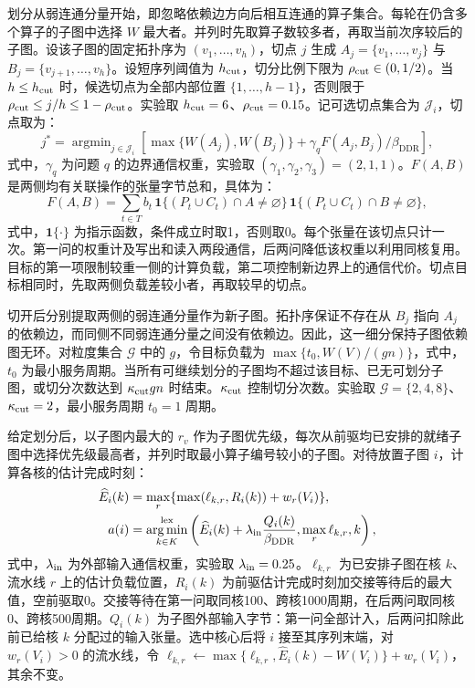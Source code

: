 划分从弱连通分量开始，即忽略依赖边方向后相互连通的算子集合。每轮在仍含多个算子的子图中选择 $W$ 最大者。并列时先取算子数较多者，再取当前次序较后的子图。设该子图的固定拓扑序为 $(v_1,\ldots,v_h)$，切点 $j$ 生成 $A_j=\{v_1,\ldots,v_j\}$ 与 $B_j=\{v_{j+1},\ldots,v_h\}$。设短序列阈值为 $h_{\rm cut}$，切分比例下限为 $\rho_{\rm cut}\in(0,1/2)$。当 $h\le h_{\rm cut}$ 时，候选切点为全部内部位置 $\{1,\ldots,h-1\}$，否则限于 $\rho_{\rm cut}\le j/h\le1-\rho_{\rm cut}$。实验取 $h_{\rm cut}=6$、$\rho_{\rm cut}=0.15$。记可选切点集合为 $\mathcal J_i$，切点取为：
\begin{equation}
 j^*=\mathop{\arg\min}_{j\in\mathcal J_i}
 \left[\max\{W(A_j),W(B_j)\}+\gamma_q F(A_j,B_j)/\beta_{\mathrm{DDR}}\right],
 \label{eq:frontier_construct}
\end{equation}
\noindent 式中，$\gamma_q$ 为问题 $q$ 的边界通信权重，实验取 $(\gamma_1,\gamma_2,\gamma_3)=(2,1,1)$。$F(A,B)$ 是两侧均有关联操作的张量字节总和，具体为：
\begin{equation}
 F(A,B)=\sum_{t\in T}b_t\,
 \mathbf1\{(P_t\cup C_t)\cap A\ne\varnothing\}\,
 \mathbf1\{(P_t\cup C_t)\cap B\ne\varnothing\},
\label{eq:cut_communication}
\end{equation}
\noindent 式中，$\mathbf1\{\cdot\}$ 为指示函数，条件成立时取1，否则取0。每个张量在该切点只计一次。第一问的权重计及写出和读入两段通信，后两问降低该权重以利用同核复用。目标的第一项限制较重一侧的计算负载，第二项控制新边界上的通信代价。切点目标相同时，先取两侧负载差较小者，再取较早的切点。

切开后分别提取两侧的弱连通分量作为新子图。拓扑序保证不存在从 $B_j$ 指向 $A_j$ 的依赖边，而同侧不同弱连通分量之间没有依赖边。因此，这一细分保持子图依赖图无环。对粒度集合 $\mathcal G$ 中的 $g$，令目标负载为 $\max\{t_0,W(V)/(gn)\}$，式中，$t_0$ 为最小服务周期。当所有可继续划分的子图均不超过该目标、已无可划分子图，或切分次数达到 $\kappa_{\rm cut}gn$ 时结束。$\kappa_{\rm cut}$ 控制切分次数。实验取 $\mathcal G=\{2,4,8\}$、$\kappa_{\rm cut}=2$，最小服务周期 $t_0=1$ 周期。

给定划分后，以子图内最大的 $r_v$ 作为子图优先级，每次从前驱均已安排的就绪子图中选择优先级最高者，并列时取最小算子编号较小的子图。对待放置子图 $i$，计算各核的估计完成时刻：
\begin{equation}
 \begin{aligned}
 \widehat E_i(k)&=\max_r\{\max(\ell_{k,r},R_i(k))+w_r(V_i)\},\\
 a(i)&=\mathop{\arg\min}_{k\in K}^{\mathrm{lex}}
 \left(\widehat E_i(k)+\lambda_{\rm in}\frac{Q_i(k)}{\beta_{\mathrm{DDR}}},\max_r\ell_{k,r},k\right),
 \end{aligned}
 \label{eq:construct_map}
\end{equation}
\noindent 式中，$\lambda_{\rm in}$ 为外部输入通信权重，实验取 $\lambda_{\rm in}=0.25$。$\ell_{k,r}$ 为已安排子图在核 $k$、流水线 $r$ 上的估计负载位置，$R_i(k)$ 为前驱估计完成时刻加交接等待后的最大值，空前驱取0。交接等待在第一问取同核100、跨核1000周期，在后两问取同核0、跨核500周期。$Q_i(k)$ 为子图外部输入字节：第一问全部计入，后两问扣除此前已给核 $k$ 分配过的输入张量。选中核心后将 $i$ 接至其序列末端，对 $w_r(V_i)>0$ 的流水线，令 $\ell_{k,r}\leftarrow\max\{\ell_{k,r},\widehat E_i(k)-W(V_i)\}+w_r(V_i)$，其余不变。

